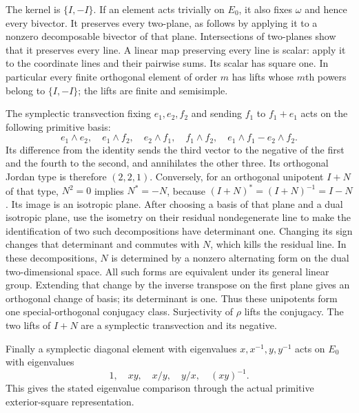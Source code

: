 \documentclass[11pt,a4paper]{article}
\theoremstyle{definition}
\begin{document}
The kernel is $\{I,-I\}$. If an element acts trivially on
$E_0$, it also fixes $\omega$ and hence every bivector.
It preserves every two-plane, as follows by applying it to a
nonzero decomposable bivector of that plane. Intersections of
two-planes show that it preserves every line. A linear map
preserving every line is scalar: apply it to the coordinate lines
and their pairwise sums. Its scalar has square one. In particular
every finite orthogonal element of order $m$ has lifts whose
$m$th powers belong to $\{I,-I\}$; the lifts are finite and
semisimple.

The symplectic transvection fixing $e_1,e_2,f_2$ and sending
$f_1$ to $f_1+e_1$ acts on the following primitive basis:
\[
 e_1\wedge e_2,\quad e_1\wedge f_2,\quad
 e_2\wedge f_1,\quad f_1\wedge f_2,\quad
 e_1\wedge f_1-e_2\wedge f_2.
\]
Its difference from the identity sends the third vector to
the negative of the first and the fourth to the second, and
annihilates the other three. Its orthogonal Jordan type is
therefore $(2,2,1)$. Conversely, for an orthogonal unipotent
$I+N$ of that type, $N^2=0$ implies $N^*=-N$, because
$(I+N)^*=(I+N)^{-1}=I-N$. Its image is an isotropic plane.
After choosing a basis of that plane and a dual isotropic
plane, use the isometry on their residual nondegenerate line
to make the identification of two such decompositions have
determinant one. Changing its sign changes that determinant
and commutes with $N$, which kills the residual line.
In these decompositions, $N$ is determined by a nonzero alternating form on
the dual two-dimensional space. All such forms are equivalent
under its general linear group. Extending that change by the
inverse transpose on the first plane gives an orthogonal
change of basis; its determinant is one. Thus these unipotents
form one special-orthogonal conjugacy class. Surjectivity of
$\rho$ lifts the conjugacy. The two lifts of $I+N$ are a
symplectic transvection and its negative. 

Finally a symplectic diagonal element with eigenvalues
$x,x^{-1},y,y^{-1}$ acts on $E_0$ with eigenvalues
\[
 1,\quad xy,\quad x/y,\quad y/x,\quad (xy)^{-1}.
\]
This gives the stated eigenvalue comparison through the actual
primitive exterior-square representation.
\end{document}
